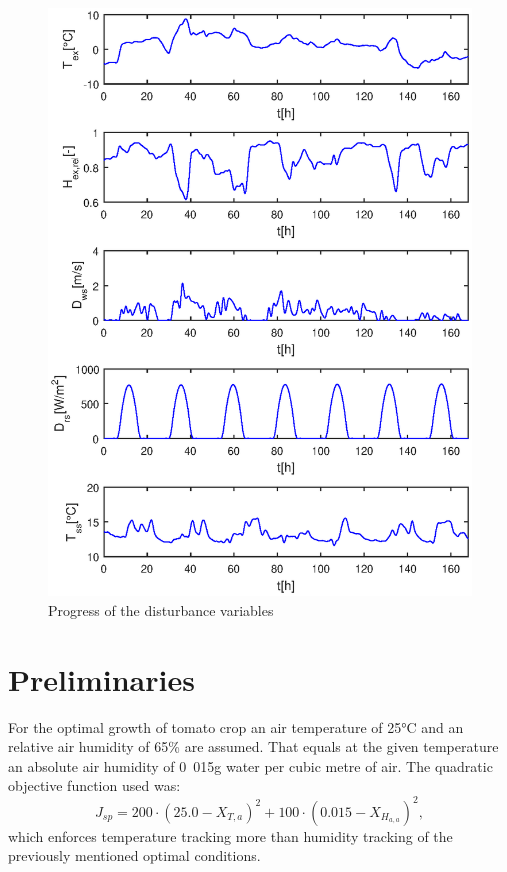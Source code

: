 \begin{figure}[!t]
\begin{center}
		\includegraphics[width=.85\textwidth]{../Figures/disturbances_mpc.eps}
		\caption{Progress of the disturbance variables}
		\label{fig:disturbances_mpc}
\end{center}
\end{figure}

\section{Preliminaries}
\label{sec:setup}

For the optimal growth of tomato crop an air temperature of \unit{25}{°C} and an relative air humidity of \unit{65}{\%} are assumed.
That equals at the given temperature an absolute air humidity of \unit{0.015}{g} water per cubic metre of air.
The quadratic objective function used was:
\begin{equation}\label{eq:objective_setpoint}
J_{sp} = 200 \cdot (25.0 - X_{T,a})^2 + 100 \cdot (0.015 - X_{H_{a,a}})^2,
\end{equation}
which enforces temperature tracking more than humidity tracking of the previously mentioned optimal conditions.

